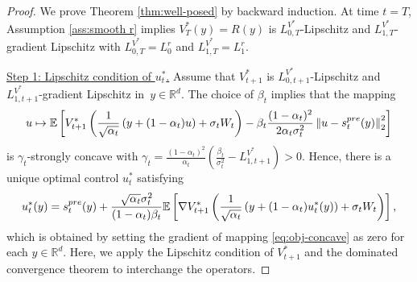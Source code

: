 \documentclass[10pt,a4paper]{amsart}
\newcommand{\R}{\mathbb{R}}
\newcommand{\bracket}[1]{\left[ #1 \right]}
\newcommand{\parenthesis}[1]{\left( #1 \right)}
\newcommand{\norm}[1]{\left \|#1\right \|}
\newcommand{\E}{\mathbb{E}}
\begin{document}
\begin{proof}
We prove Theorem \ref{thm:well-posed} by backward induction. At time $t = T$, Assumption \ref{ass:smooth r} implies $V_T^*(y) = R(y)$ is $L_{0, T}^{V^*}$-Lipschitz and $L_{1, T}^{V^*}$-gradient Lipschitz with $L_{0, T}^{V^*} = L_0^r$ and $L_{1, T}^{V^*} = L_1^r$.

\underline{Step 1: Lipschitz condition of $ u_{t}^{*} $.} Assume that $V^*_{t+1}$ is $L_{0, t+1}^{V^*}$-Lipschitz and $L_{1, t+1}^{V^*}$-gradient Lipschitz in~$y\in \R^d$. The choice of $\beta_t$ implies that the mapping
\begin{eqnarray}\label{eq:obj-concave}
    u \mapsto \E\bracket{V^{*}_{t+1}\left(\frac{1}{\sqrt{\alpha_t}}\parenthesis{y + (1 - \alpha_t)u} + \sigma_t W_t\right) - \beta_t \frac{(1 - \alpha_{t})^{2}}{2\alpha_{t}\sigma_{t}^{2}}\norm{u - s^{\rm pre}_{t}(y)}_{2}^{2}}
\end{eqnarray}
is $\gamma_t$-strongly concave with $ \gamma_{t} = \frac{(1 - \alpha_{t})^{2}}{\alpha_{t}}\parenthesis{\frac{\beta_{t}}{\sigma_{t}^{2}} - L_{1, t+1}^{V^{*}}} > 0 $. Hence, there is a unique optimal control $u_t^*$ satisfying
\begin{eqnarray}\label{eq:u*(y)-re}
     u_{t}^{*}(y)  = s_{t}^{\rm pre}(y) + \frac{\sqrt{\alpha_{t}}\sigma_{t}^{2}}{(1 - \alpha_{t})\beta_t}\E\bracket{\nabla V_{t+1}^{*}\left(\frac{1}{\sqrt{\alpha_t}}\parenthesis{y + (1 - \alpha_t)u_t^*(y)} + \sigma_t W_t\right)},
\end{eqnarray}
which is obtained by setting the gradient of mapping \eqref{eq:obj-concave} as zero for each $y \in \R^d$.
Here, we apply the Lipschitz condition of $V_{t+1}^*$ and the dominated convergence theorem to interchange the operators. 


\end{proof}
\end{document}

